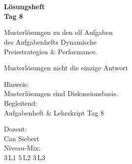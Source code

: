 \documentclass[11pt,a4paper,oneside]{article}
\begin{document}
\begin{titlepage}
  \pagestyle{empty}
  \vspace*{1.5cm}
  \\[2pt]
  \noindent{\color{lpAccent}\rule{\linewidth}{1.2pt}}\\[4pt]

  \vspace{3cm}
  {\sffamily\fontsize{30}{34}\selectfont\bfseries\color{lpInk}Lösungsheft\\Tag 8\par}

  \vspace{0.7cm}
  {\sffamily\large\color{lpGray}Musterlösungen zu den elf Aufgaben\\des Aufgabenhefts \textendash{} Dynamische\\Preisstrategien \& Performance.\par}

  \vspace{1.5cm}
  {\caveatfont\LARGE\color{lpGreen}Musterlösungen \textperiodcentered{} nicht die einzige Antwort}\par

  \vfill

  \noindent\begin{minipage}{0.55\linewidth}
    {\sffamily\footnotesize\color{lpGray}Hinweis:}\\
    {\sffamily\small\color{lpInk}Musterlösungen sind Diskussionsbasis.}\\[10pt]
    {\sffamily\footnotesize\color{lpGray}Begleitend:}\\
    {\sffamily\small\color{lpInk}Aufgabenheft \& Lehrskript Tag 8}
  \end{minipage}\hfill
  \begin{minipage}{0.4\linewidth}
    \raggedleft
    {\sffamily\footnotesize\color{lpGray}Dozent:}\\
    {\sffamily\small\color{lpInk}Can Siebert}\\[10pt]
    {\sffamily\footnotesize\color{lpGray}Niveau-Mix:}\\
    {\sffamily\small\color{lpInk}3\,L1 \textperiodcentered{} 5\,L2 \textperiodcentered{} 3\,L3}
  \end{minipage}

  \vspace{0.5cm}
  \noindent{\color{lpAccent}\rule{\linewidth}{0.6pt}}
\end{titlepage}
\end{document}
